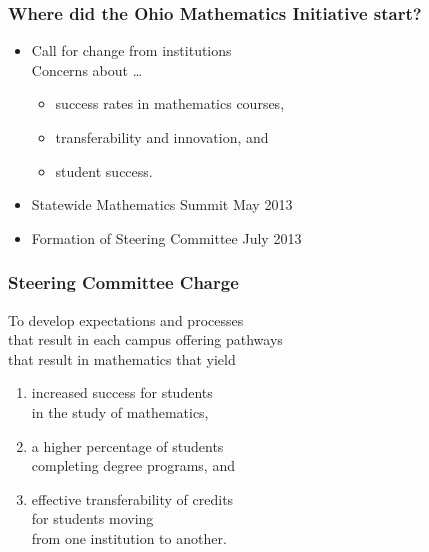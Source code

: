 \documentclass[14pt]{beamer}
\newcounter{a}
\newcounter{b}
\begin{document}
\begin{frame}
  \frametitle{Where did the Ohio Mathematics Initiative start?}

  \begin{itemize}
  \item Call for change from institutions \\[0.5ex]
    Concerns about \ldots
    \begin{itemize}
      \item success rates in mathematics courses,
      \item transferability and innovation, \textcolor{dark}{and}
      \item student success.
    \end{itemize}
  \item Statewide Mathematics Summit \hfill\textcolor{dark}{May 2013}
  \item Formation of Steering Committee \hfill\textcolor{dark}{July 2013}
  \end{itemize}
\end{frame}

\begin{frame}
  \frametitle{Steering Committee Charge}
  
  To develop expectations and processes \\\quad that result in each campus offering pathways \\\quad that result in mathematics that yield
  \begin{enumerate}
    \item increased success for students \\\quad in the study of mathematics,
    \item a higher percentage of students \\\quad completing degree     
      programs, \textcolor{dark}{and}
    \item effective transferability of credits \\\quad for students moving 
      \\\quad\quad from one institution to another.
  \end{enumerate}
  
\end{frame}
\end{document}
